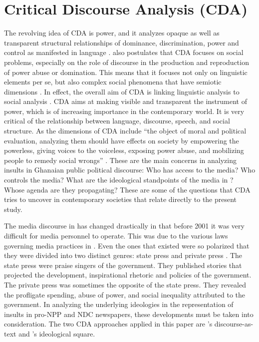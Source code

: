 \documentclass[output=paper,modfonts]{langscibook}
\begin{document}
\section{Critical Discourse Analysis (CDA)}\label{sec:ofori:2}

The revolving idea of CDA is power, and it analyzes opaque as well as transparent structural relationships of dominance, discrimination, power and control as manifested in language \citep[2]{Wodak2001}. \citet[96]{vanDijk2001} also postulates that CDA focuses on social problems, especially on the role of discourse in the production and reproduction of power abuse or domination. This means that it focuses not only on linguistic elements per se, but also complex social phenomena that have semiotic dimensions \citep{WodakMeyer2009}.  In effect, the overall aim of CDA is linking linguistic analysis to social analysis \citep[206]{WoodsKroger2000}. CDA aims at making visible and transparent the instrument of power, which is of increasing importance in the contemporary world. It is very critical of the relationship between language, discourse, speech, and social structure. As the dimensions of CDA include “the object of moral and political evaluation, analyzing them should have effects on society by empowering the powerless, giving voices to the voiceless, exposing power abuse, and mobilizing people to remedy social wrongs” \citep[25]{Blommaert2005}. These are the main concerns in analyzing insults in Ghanaian public political discourse: Who has access to the media? Who controls the media? What are the ideological standpoints of the media in ? Whose agenda are they propagating? These are some of the questions that CDA tries to uncover in contemporary societies that relate directly to the present study.

The media discourse in  has changed drastically in that before 2001 it was very difficult for media personnel to operate. This was due to the various laws governing media practices in . Even the ones that existed were so polarized that they were divided into two distinct genres: state press and private press \citep{Hasty2005}. The state press were praise singers of the government. They published stories that projected the development, inspirational rhetoric and policies of the government. The private press was sometimes the opposite of the state press. They revealed the profligate spending, abuse of power, and social inequality attributed to the government. In analyzing the underlying ideologies in the representation of insults in pro-NPP and NDC newspapers, these developments must be taken into consideration. The two CDA approaches applied in this paper are \citeauthor{Fairclough1989}’s discourse-as-text and \citeauthor{vanDijk1995}’s ideological square.
\end{document}
